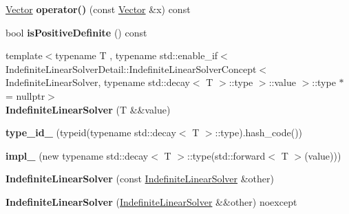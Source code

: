 \begin{DoxyCompactItemize}
\item 
\hypertarget{classSpacy_1_1IndefiniteLinearSolver_a150a854c97a44c1c53c4aa071e1b8b12}{\hyperlink{classSpacy_1_1Vector}{\-Vector} {\bfseries operator()} (const \hyperlink{classSpacy_1_1Vector}{\-Vector} \&x) const }\label{classSpacy_1_1IndefiniteLinearSolver_a150a854c97a44c1c53c4aa071e1b8b12}

\item 
\hypertarget{classSpacy_1_1IndefiniteLinearSolver_a04191e6ed2c8cd54870c79a919dcae39}{bool {\bfseries is\-Positive\-Definite} () const }\label{classSpacy_1_1IndefiniteLinearSolver_a04191e6ed2c8cd54870c79a919dcae39}

\item 
\hypertarget{classSpacy_1_1IndefiniteLinearSolver_af60b1bb12efcf0daccfb48122867ea96}{{\footnotesize template$<$typename T , typename std\-::enable\-\_\-if$<$ Indefinite\-Linear\-Solver\-Detail\-::\-Indefinite\-Linear\-Solver\-Concept$<$ Indefinite\-Linear\-Solver, typename std\-::decay$<$ T $>$\-::type $>$\-::value $>$\-::type $\ast$  = nullptr$>$ }\\{\bfseries \-Indefinite\-Linear\-Solver} (\-T \&\&value)}\label{classSpacy_1_1IndefiniteLinearSolver_af60b1bb12efcf0daccfb48122867ea96}

\item 
\hypertarget{classSpacy_1_1IndefiniteLinearSolver_af2888ec80cf84e083d4943e0e0e35293}{{\bfseries type\-\_\-id\-\_\-} (typeid(typename std\-::decay$<$ \-T $>$\-::type).hash\-\_\-code())}\label{classSpacy_1_1IndefiniteLinearSolver_af2888ec80cf84e083d4943e0e0e35293}

\item 
\hypertarget{classSpacy_1_1IndefiniteLinearSolver_a53603e7bc5d7e369775d4519535696cf}{{\bfseries impl\-\_\-} (new typename std\-::decay$<$ \-T $>$\-::type(std\-::forward$<$ \-T $>$(value)))}\label{classSpacy_1_1IndefiniteLinearSolver_a53603e7bc5d7e369775d4519535696cf}

\item 
\hypertarget{classSpacy_1_1IndefiniteLinearSolver_a85f4481ed4c6f349cede484c25ba259e}{{\bfseries \-Indefinite\-Linear\-Solver} (const \hyperlink{classSpacy_1_1IndefiniteLinearSolver}{\-Indefinite\-Linear\-Solver} \&other)}\label{classSpacy_1_1IndefiniteLinearSolver_a85f4481ed4c6f349cede484c25ba259e}

\item 
\hypertarget{classSpacy_1_1IndefiniteLinearSolver_affb21cb06e47a51c0f228f11a84fc3fd}{{\bfseries \-Indefinite\-Linear\-Solver} (\hyperlink{classSpacy_1_1IndefiniteLinearSolver}{\-Indefinite\-Linear\-Solver} \&\&other) noexcept}\label{classSpacy_1_1IndefiniteLinearSolver_affb21cb06e47a51c0f228f11a84fc3fd}


\end{DoxyCompactItemize}
